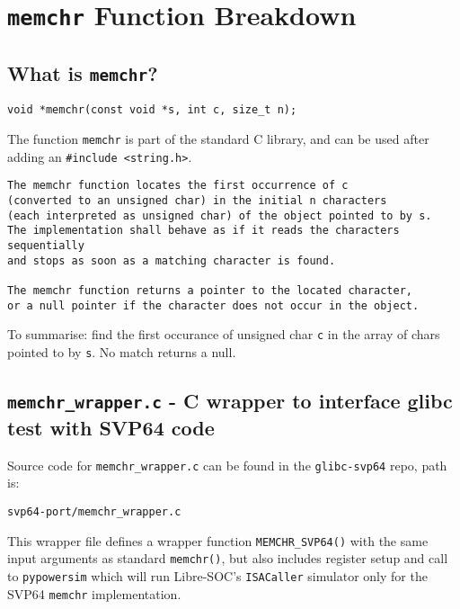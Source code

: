 %

\section{\texttt{memchr} Function Breakdown}

\subsection{What is \texttt{memchr}?}

\begin{verbatim}
void *memchr(const void *s, int c, size_t n);
\end{verbatim}

The function \texttt{memchr} is part of the standard C library, and can be used
after adding an \texttt{\#include <string.h>}.

\begin{verbatim}
The memchr function locates the first occurrence of c
(converted to an unsigned char) in the initial n characters
(each interpreted as unsigned char) of the object pointed to by s.
The implementation shall behave as if it reads the characters sequentially
and stops as soon as a matching character is found.

The memchr function returns a pointer to the located character,
or a null pointer if the character does not occur in the object.
\end{verbatim}

To summarise: find the first occurance of unsigned char \texttt{c} in the
array of chars pointed to by \texttt{s}. No match returns a null.

\subsection{\texttt{memchr\_wrapper.c} - C wrapper to interface glibc test with SVP64 code}

Source code for \texttt{memchr\_wrapper.c} can be found in the
\texttt{glibc-svp64} repo, path is:
\begin{verbatim}
svp64-port/memchr_wrapper.c
\end{verbatim}

This wrapper file defines a wrapper function \texttt{MEMCHR\_SVP64()} with the
same input arguments as standard \texttt{memchr()}, but also includes
register setup and call to \texttt{pypowersim} which will run
Libre-SOC's \texttt{ISACaller} simulator only for
the \acrshort{SVP64} \texttt{memchr} implementation.\\

